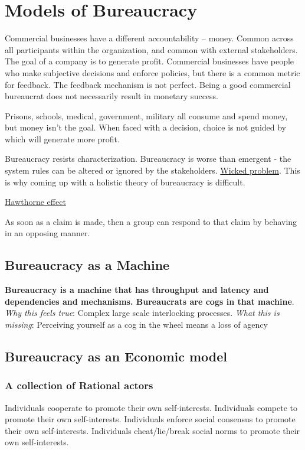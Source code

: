 \section{Models of Bureaucracy}

Commercial businesses have a different accountability -- money. Common across all participants within the organization, and common with external stakeholders. The goal of a company is to generate profit. Commercial businesses have people who make subjective decisions and enforce policies, but there is a common metric for feedback. The feedback mechanism is not perfect. Being a good commercial bureaucrat does not necessarily result in monetary success.

Prisons, schools, medical, government, military all consume and spend money, but money isn't the goal. When faced with a decision, choice is not guided by which will generate more profit.


Bureaucracy resists characterization. Bureaucracy is worse than emergent - the system rules can be altered or ignored by the stakeholders. \href{https://en.wikipedia.org/wiki/Wicked_problem}{Wicked problem}. This is why coming up with a holistic theory of bureaucracy is difficult. 

\href{https://en.wikipedia.org/wiki/Hawthorne_effect}{Hawthorne effect}

As soon as a claim is made, then a group can respond to that claim by behaving in an opposing manner. 

\subsection{Bureaucracy as a Machine}

\textbf{Bureaucracy is a machine that has throughput and latency and dependencies and mechanisms. Bureaucrats are cogs in that machine}.\\
\textit{Why this feels true}: Complex large scale interlocking processes.
\textit{What this is missing}: Perceiving yourself as a cog in the wheel means a loss of agency


\subsection{Bureaucracy as an Economic model}

\subsubsection{A collection of Rational actors}
Individuals cooperate to promote their own self-interests.
Individuals compete to promote their own self-interests.
Individuals enforce social consensus to promote their own self-interests.
Individuals cheat/lie/break social norms to promote their own self-interests.


